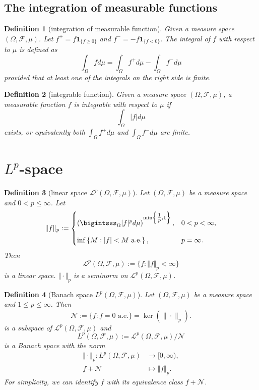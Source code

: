 \documentclass{report}
\newtheorem{definition}{Definition}[section]
\theoremstyle{nonumberplain}
\begin{document}
\subsection{The integration of measurable functions}
\begin{definition}[integration of measurable function]
	Given a measure space $(\Omega, \mathcal{F},\mu)$. Let $f^{+}=f \mathbf{1}_{\{f \geq 0\}}$ and $f^{-}=-f \mathbf{1}_{\{f<0\}} .$ The integral of $f$ with respect to $\mu$ is defined as
	\[
	\int_\Omega f d \mu=\int_\Omega f^{+} d \mu-\int_\Omega f^{-} d \mu
	\]
	provided that at least one of the integrals on the right side is finite.
\end{definition}

\begin{definition}[integrable function]
	Given a measure space $(\Omega, \mathcal{F},\mu)$, a measurable function $f$ is integrable with respect to $\mu$ if
	\[
	\int_\Omega |f| d \mu
	\]
	exists, or equivalently both $\int_\Omega f^+ d \mu$ and $\int_\Omega f^- d \mu$ are finite.
\end{definition}

\section{$L^p$-space}

\begin{definition}[linear space $\mathcal{L}^p(\Omega, \mathcal{F}, \mu)$] Let $(\Omega, \mathcal{F}, \mu)$ be a measure space and $0< p \leq\infty$. Let
\[
	\Vert f\Vert_p:=
	\begin{cases}
		\left(\bigintsss_\Omega |f|^pd\mu\right)^{\min\left\{\tfrac{1}{p},1\right\}},&0< p< \infty,\\[10pt]
		\inf \left\{M: |f|<M\text{ a.e.}\right\},&p=\infty.
	\end{cases}
\]
Then 
\[
\mathcal{L}^{p}(\Omega, \mathcal{F}, \mu):=\{f:\Vert f\Vert_p<\infty\}
\]
is a linear space. $\Vert \cdot\Vert_p$ is a seminorm on $\mathcal{L}^{p}(\Omega, \mathcal{F}, \mu)$.

\end{definition}


\begin{definition}[Banach space $L^p(\Omega, \mathcal{F}, \mu)$] Let $(\Omega, \mathcal{F}, \mu)$ be a measure space and $1\le p \leq\infty$. Then
	\[
	\mathcal{N}:=\{f: f=0\text{ a.e.}\}=\operatorname{ker}\left(\|\cdot\|_{p}\right).
	\]
	is a subspace of $\mathcal{L}^{p}(\Omega, \mathcal{F}, \mu)$ and
	\[
	L^{p}(\Omega, \mathcal{F}, \mu):=\mathcal{L}^{p}(\Omega, \mathcal{F}, \mu)/\mathcal{N}
	\]
	is a Banach space with the norm
	\begin{align*}
	\Vert \cdot\Vert_p:L^{p}(\Omega, \mathcal{F}, \mu)&\longrightarrow [0,\infty),\\
	f+\mathcal{N} &\longmapsto \Vert f\Vert_p.
	\end{align*}
    For simplicity, we can identify $f$ with its equivalence class $f+\mathcal{N}$.
\end{definition}
\end{document}
